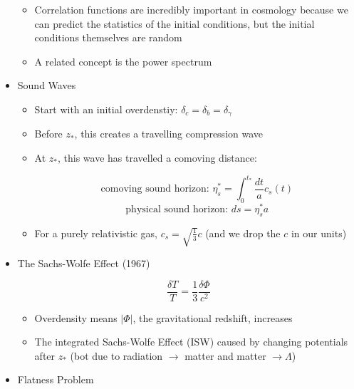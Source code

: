 \begin{itemize}
\begin{itemize}
      \item Correlation functions are incredibly important in cosmology because we can predict the statistics of the initial conditions, but the initial conditions themselves are random

      \item A related concept is the power spectrum

    \end{itemize}

  \item Sound Waves

    \begin{itemize}

      \item Start with an initial overdenstiy: $\delta_c=\delta_b=\delta_{\gamma}$

      \item Before $z_{*}$, this creates a travelling compression wave

      \item At $z_{*}$, this wave has travelled a comoving distance:

        $$\text{comoving sound horizon: }\eta^{*}_s=\int_0^{t_{*}}\frac{dt}{a}c_s(t)$$
        $$\text{physical sound horizon: }ds=\eta^{*}_sa$$

      \item For a purely relativistic gas, $c_s=\sqrt{\frac{1}{3}}c$ (and we drop the $c$ in our units)

    \end{itemize}

  \item The Sachs-Wolfe Effect (1967)

    $$\frac{\delta T}{T}=\frac{1}{3}\frac{\delta \Phi}{c^2}$$

    \begin{itemize}

      \item Overdensity means $|\Phi|$, the gravitational redshift, increases

      \item The integrated Sachs-Wolfe Effect (ISW) caused by changing potentials after $z_{*}$ (bot due to radiation $\to$ matter and matter $\to\Lambda$)

    \end{itemize}

  \item Flatness Problem

    \begin{itemize}


\end{itemize}
\end{itemize}
